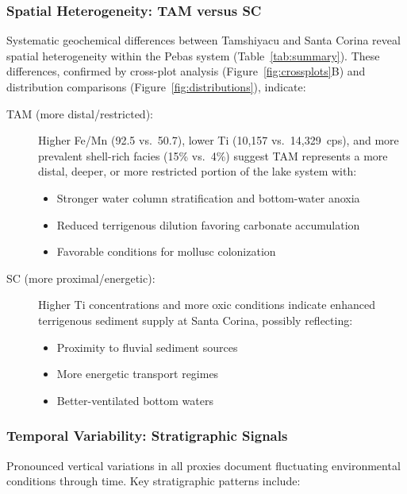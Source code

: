 \documentclass[11pt,a4paper]{article}
\begin{document}
\subsubsection{Spatial Heterogeneity: TAM versus SC}

Systematic geochemical differences between Tamshiyacu and Santa Corina reveal spatial heterogeneity within the Pebas system (Table~\ref{tab:summary}). These differences, confirmed by cross-plot analysis (Figure~\ref{fig:crossplots}B) and distribution comparisons (Figure~\ref{fig:distributions}), indicate:

\begin{description}
    \item[TAM (more distal/restricted):] Higher Fe/Mn (92.5 vs.\ 50.7), lower Ti (10,157 vs.\ 14,329~cps), and more prevalent shell-rich facies (15\% vs.\ 4\%) suggest TAM represents a more distal, deeper, or more restricted portion of the lake system with:
    \begin{itemize}
        \item Stronger water column stratification and bottom-water anoxia
        \item Reduced terrigenous dilution favoring carbonate accumulation
        \item Favorable conditions for mollusc colonization
    \end{itemize}

    \item[SC (more proximal/energetic):] Higher Ti concentrations and more oxic conditions indicate enhanced terrigenous sediment supply at Santa Corina, possibly reflecting:
    \begin{itemize}
        \item Proximity to fluvial sediment sources
        \item More energetic transport regimes
        \item Better-ventilated bottom waters
    \end{itemize}
\end{description}

\subsubsection{Temporal Variability: Stratigraphic Signals}

Pronounced vertical variations in all proxies document fluctuating environmental conditions through time. Key stratigraphic patterns include:
\end{document}
